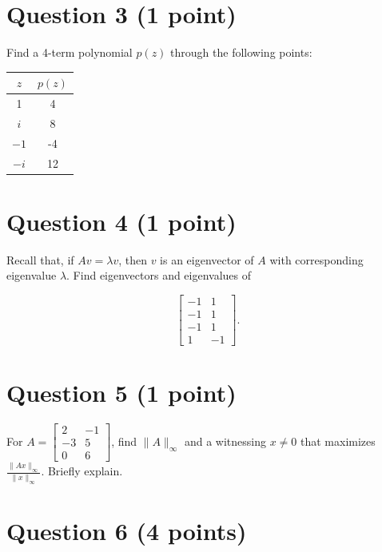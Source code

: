 \documentclass[lang=cn,11pt]{elegantbook}
\begin{document}
\section*{Question 3 (1 point)}

Find a 4-term polynomial \( p(z) \) through the following points:

\begin{center}
\begin{tabular}{c|c}
    \( z \) & \( p(z) \) \\
    \hline
    1 & 4 \\
    \( i \) & 8 \\
    \( -1 \) & -4 \\
    \( -i \) & 12 \\
\end{tabular}
\end{center}

\section*{Question 4 (1 point)}

Recall that, if \( Av = \lambda v \), then \( v \) is an eigenvector of \( A \) with corresponding eigenvalue \( \lambda \). Find eigenvectors and eigenvalues of

\[
\begin{bmatrix}
    -1 & 1 \\
    -1 & 1 \\
    -1 & 1 \\
     1 & -1
\end{bmatrix}.
\]

\section*{Question 5 (1 point)}

For \( A = \begin{bmatrix} 2 & -1 \\ -3 & 5 \\ 0 & 6 \end{bmatrix} \), find \( \|A\|_{\infty} \) and a witnessing \( x \neq 0 \) that maximizes \( \frac{\|Ax\|_{\infty}}{\|x\|_{\infty}} \). Briefly explain.






\section*{Question 6 (4 points)}
\end{document}

